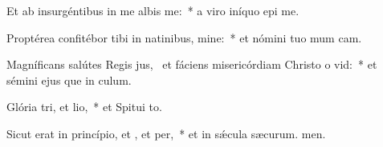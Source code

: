 \item Et ab insurgéntibus in me albis me:~* a viro iníquo epi me.
\item Proptérea confitébor tibi in natinibus, mine:~* et nómini tuo mum cam.
\item Magníficans salútes Regis jus,~\pscross{} et fáciens misericórdiam Christo o vid:~* et sémini ejus que in culum.
\item Glória tri, et lio,~* et Spitui to.
\item Sicut erat in princípio, et , et per,~* et in sǽcula sæcurum. men.
